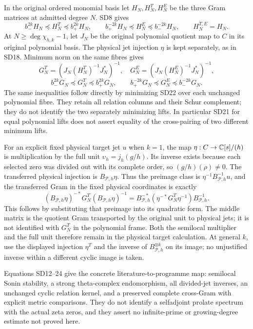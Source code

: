In the original ordered monomial basis let $H_N,H_N^T,H_N^E$
be the three Gram matrices at admitted degree $N$. SD8 gives
\[
 b_-^{2k}H_N\preceq H_N^T\preceq b_+^{2k}H_N,\qquad
 b_+^{-2k}H_N\preceq H_N^E\preceq b_-^{-2k}H_N,\qquad
 H_N^{T,E}=H_N.                                               \tag{SD22}
\]
At $N\ge\deg\chi_{h,k}-1$, let $J_N$ be the original polynomial
quotient map to $C$ in its original polynomial basis. The physical
jet injection $\eta$ is kept separately, as in SD18. Minimum norm on the same
fibres gives
\[
 G_N^T=(J_N(H_N^T)^{-1}J_N^*)^{-1},\quad
 G_N^E=(J_N(H_N^E)^{-1}J_N^*)^{-1},
\]
\[
 b_-^{2k}G_N\preceq G_N^T\preceq b_+^{2k}G_N,\qquad
 b_+^{-2k}G_N\preceq G_N^E\preceq b_-^{-2k}G_N.                \tag{SD23}
\]
The same inequalities follow directly by minimizing SD22 over
each unchanged polynomial fibre. They retain all relation columns
and their Schur complement; they do not identify the two separately
minimizing lifts. In particular SD21 for equal polynomial lifts
does not assert equality of the cross-pairing of two different
minimum lifts.

For an explicit fixed physical target jet $u$ when $k=1$, the
map $\eta:C\to\mathbb C[s]/(h)$ is multiplication by the full unit
$\upsilon_h=j_h(g/h)$. Its inverse exists because each selected
zero was divided out with its complete order, so
$(g/h)(\rho)\ne0$. The transferred physical injection is $B_{\mathcal
P,h}\eta$. Thus the preimage class is
$\eta^{-1}B_{\mathcal P,h}^{-1}u$, and the transferred Gram in
the fixed physical coordinates is exactly
\[
 (B_{\mathcal P,h}\eta)^{-*}G_N^T
              (B_{\mathcal P,h}\eta)^{-1}
 =B_{\mathcal P,h}^{-*}
       (\eta^{-*}G_N^T\eta^{-1})B_{\mathcal P,h}^{-1}.
                                                               \tag{SD24}
\]
This follows by substituting that preimage into its quadratic form.
The middle matrix is the quotient Gram transported by the original
unit to physical jets; it is not identified with $G_N^T$ in the
polynomial frame. Both the semilocal multiplier and the full unit
therefore remain in the physical target calculation.
At general $k$, use the displayed injection $\eta^T$ and the inverse
of $B_{\mathcal P,h}^{\otimes k}$ on its image; no unjustified
inverse within a different cyclic image is taken.

Equations SD12--24 give the concrete literature-to-programme map:
semilocal Sonin stability, a strong theta-complex endomorphism,
all divided-jet inverses, an unchanged cyclic relation kernel,
and a preserved complete cross-Gram with explicit metric comparisons.
They do not identify a selfadjoint prolate spectrum with the actual
zeta zeros, and they assert no infinite-prime or growing-degree
estimate not proved here.

